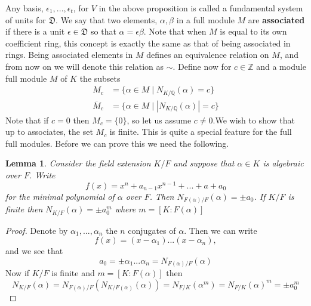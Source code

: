 \documentclass{article}
\newtheorem{lemma}{Lemma}[section]
\newcommand{\mfrak}[1]{\mathfrak{#1}}
\newcommand{\mbb}[1]{\mathbb{#1}}
\numberwithin{equation}{section}
\begin{document}
Any basis, $\epsilon_1, ..., \epsilon_t$, for $V$ in the above proposition is called a fundamental system of units for $\mfrak D$. We say that two elements, $\alpha,\beta$ in a full module $M$ are \textbf{associated} if there is a unit $\epsilon \in \mfrak D$ so that $\alpha = \epsilon \beta$. Note that when $M$ is equal to its own coefficient ring, this concept is exactly the same as that of being associated in rings. Being associated elements in $M$ defines an equivalence relation on $M$, and from now on we will denote this relation as $\sim$. Define now for $c \in \mbb Z$ and a module full module $M$ of $K$ the subsets
\begin{align*}
	M_c       	& = \{ \alpha \in M \mid N_{K/\mbb Q}(\alpha) = c\} 	\\
	\overline M_c & = \{ \alpha \in M \mid | N_{K /\mbb Q}(\alpha) | = c\}
\end{align*}
Note that if $c = 0$ then $M_c = \{ 0\}$, so let us assume $c \neq 0$.We wish to show that up to associates, the set $M_c$ is finite. This is quite a special feature for the full full modules. Before we can prove this we need the following.

\begin{lemma}\label{lem: norm of algebraic number is pm 0th coefficient}
	Consider the field extension $K / F$ and suppose that $\alpha \in K$ is algebraic over $F$. Write
	$$f(x) = x^n + a_{n-1} x^{n-1} + ... + a+a_0$$
	for the minimal polynomial of $\alpha$ over $F$. Then $N_{F(\alpha)/F} (\alpha) = \pm a_0$. If $K / F$ is finite then $N_{K / F}(\alpha) = \pm a_0^m$
	where $m = [K : F(\alpha)]$
\end{lemma}
\begin{proof}
	Denote by $\alpha_1, ..., \alpha_n$ the $n$ conjugates of $\alpha$. Then we can write
	$$f(x) = (x-\alpha_1)...(x-\alpha_n),$$
	and we see that
	$$a_0 = \pm \alpha_1 ... \alpha_n = N_{F(\alpha) / F}(\alpha)$$
	Now if $K/F$ is finite and $m = [K : F(\alpha)]$ then
	$$N_{K / F}(\alpha) = N_{F(\alpha) / F}(N_{K / F(\alpha)}(\alpha)) = N_{F / K}(\alpha^m) = N_{F / K}(\alpha)^m = \pm a_0^m$$
\end{proof}
\end{document}
